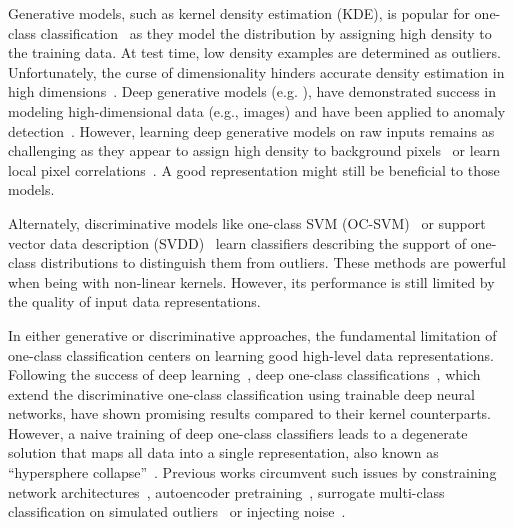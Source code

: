 \documentclass{article} \usepackage{iclr2021_conference,times}
\begin{document}
Generative models, such as kernel density estimation (KDE), is popular for one-class classification~\citep{breunig2000lof,latecki2007outlier} as they model the distribution by assigning high density to the training data. At test time, low density examples are determined as outliers. Unfortunately, the curse of dimensionality hinders accurate density estimation in high dimensions~\citep{tsybakov2008introduction}. Deep generative models (e.g. \cite{van2016pixel,kingma2018glow,kingma2013auto}), have demonstrated success in modeling high-dimensional data (e.g., images) and have been applied to anomaly detection~\citep{zhai2016deep,zong2018deep,choi2018waic,ren2019likelihood,morningstar2020density}. However, learning deep generative models on raw inputs remains as challenging as they appear to assign high density to background pixels~\citep{ren2019likelihood} or learn local pixel correlations~\citep{kirichenko2020normalizing}. A good representation might still be beneficial to those models.

Alternately, discriminative models like one-class SVM (OC-SVM)~\citep{scholkopf2000support} or support vector data description (SVDD)~\citep{tax2004support} learn classifiers describing the support of one-class distributions to distinguish them from outliers. These methods are powerful when being with non-linear kernels. However, its performance is still limited by the quality of input data representations.

In either generative or discriminative approaches, the fundamental limitation of one-class classification centers on learning good high-level data representations. Following the success of deep learning~\citep{lecun2015deep}, deep one-class classifications~\citep{ruff2018deep,chalapathy2018anomaly,oza2018one}, which extend the discriminative one-class classification using trainable deep neural networks, have shown promising results compared to their kernel counterparts. However, a naive training of deep one-class classifiers leads to a degenerate solution that maps all data into a single representation, also known as ``hypersphere collapse''~\citep{ruff2018deep}. Previous works circumvent such issues by constraining network architectures~\citep{ruff2018deep}, autoencoder pretraining~\citep{ruff2018deep,chalapathy2018anomaly},  surrogate multi-class classification on simulated outliers~\citep{hendrycks2018deep,golan2018deep,hendrycks2019using,bergman2020classification} or injecting  noise~\citep{oza2018one}.
\end{document}
